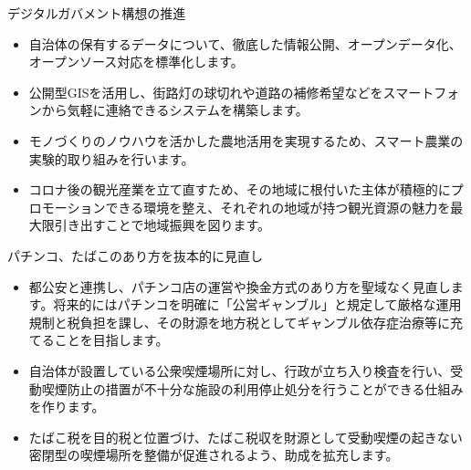 \documentclass[dvipdfmx]{beamer}
\begin{document}
    \begin{frame}{デジタルガバメント構想の推進}{}
        \begin{small}
            \begin{itemize}
                \setlength{\itemsep}{2mm}
                \item 自治体の保有するデータについて、徹底した情報公開、オープンデータ化、オープンソース対応を標準化します。
                \item 公開型GISを活用し、街路灯の球切れや道路の補修希望などをスマートフォンから気軽に連絡できるシステムを構築します。
                \item モノづくりのノウハウを活かした農地活用を実現するため、スマート農業の実験的取り組みを行います。
                \item コロナ後の観光産業を立て直すため、その地域に根付いた主体が積極的にプロモーションできる環境を整え、それぞれの地域が持つ観光資源の魅力を最大限引き出すことで地域振興を図ります。
            \end{itemize}
        \end{small}
    \end{frame}

    \begin{frame}{パチンコ、たばこのあり方を抜本的に見直し}{}
        \begin{small}
            \begin{itemize}
                \setlength{\itemsep}{2mm}
                \item 都公安と連携し、パチンコ店の運営や換金方式のあり方を聖域なく見直します。将来的にはパチンコを明確に「公営ギャンブル」と規定して厳格な運用規制と税負担を課し、その財源を地方税としてギャンブル依存症治療等に充てることを目指します。
                \item 自治体が設置している公衆喫煙場所に対し、行政が立ち入り検査を行い、受動喫煙防止の措置が不十分な施設の利用停止処分を行うことができる仕組みを作ります。
                \item たばこ税を目的税と位置づけ、たばこ税収を財源として受動喫煙の起きない密閉型の喫煙場所を整備が促進されるよう、助成を拡充します。
            \end{itemize}
        \end{small}
    \end{frame}
\end{document}
